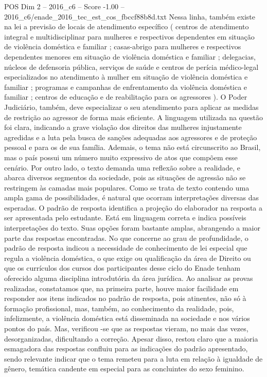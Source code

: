 \begin{textsample}{POS Dim 2 – 2016\_c6 – Score -1.00 – 2016\_c6/enade\_2016\_tec\_est\_cos\_fbccf88b8d.txt}
Nessa linha, também existe na lei a previsão de locais de atendimento específico ( centros de atendimento integral e multidisciplinar para mulheres e respectivos dependentes em situação de violência doméstica e familiar ; casas-abrigo para mulheres e respectivos dependentes menores em situação de violência doméstica e familiar ; delegacias, núcleos de defensoria pública, serviços de saúde e centros de perícia médico-legal especializados no atendimento à mulher em situação de violência doméstica e familiar ; programas e campanhas de enfrentamento da violência doméstica e familiar ; centros de educação e de reabilitação para os agressores ).
O Poder Judiciário, também, deve especializar o seu atendimento para aplicar as medidas de restrição ao agressor de forma mais eficiente.
A linguagem utilizada na questão foi clara, indicando a grave violação dos direitos das mulheres injustamente agredidas e a luta pela busca de sanções adequadas aos agressores e de proteção pessoal e para os de sua família.
Ademais, o tema não está circunscrito ao Brasil, mas o país possui um número muito expressivo de atos que compõem esse cenário.
Por outro lado, o texto demanda uma reflexão sobre a realidade, e abarca diversos segmentos da sociedade, pois as situações de agressão não se restringem às camadas mais populares.
Como se trata de texto contendo uma ampla gama de possibilidades, é natural que ocorram interpretações diversas das esperadas.
O padrão de resposta identifica a projeção do elaborador na resposta a ser apresentada pelo estudante.
Está em linguagem correta e indica possíveis interpretações do texto.
Suas opções foram bastante amplas, abrangendo a maior parte das respostas encontradas.
No que concerne ao grau de profundidade, o padrão de resposta indicou a necessidade de conhecimento de lei especial que regula a violência doméstica, o que exige ou qualificação da área de Direito ou que os currículos dos cursos dos participantes desse ciclo do Enade tenham oferecido alguma disciplina introdutória da área jurídica.
Ao analisar as provas realizadas, constatamos que, na primeira parte, houve maior facilidade em responder aos itens indicados no padrão de resposta, pois atinentes, não só à formação profissional, mas, também, ao conhecimento da realidade, pois, infelizmente, a violência doméstica está disseminada na sociedade e nos vários pontos do país.
Mas, verificou -se que as respostas vieram, no mais das vezes, desorganizadas, dificultando a correção.
Apesar disso, restou claro que a maioria esmagadora das respostas confluiu para as indicações do padrão apresentado, sendo relevante indicar que o tema remeteu para a luta em relação à igualdade de gênero, temática candente em especial para as concluintes do sexo feminino.

\end{textsample}

